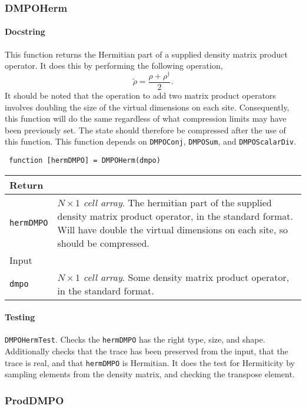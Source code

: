  \subsubsection{DMPOHerm}
 \paragraph{Docstring} This function returns the Hermitian part of a supplied density matrix product operator. It does this by performing the following operation, 
 \begin{equation}
 \tilde{\rho} = \frac{\rho + \rho^{\dagger}}{2}.
 \label{eq:vs3-2}
 \end{equation}
 It should be noted that the operation to add two matrix product operators involves doubling the size of the virtual dimensions on each site. Consequently, this function will do the same regardless of what compression limits may have been previously set. The state should therefore be compressed after the use of this function. This function depends on \lstinline$DMPOConj$, \lstinline$DMPOSum$, and \lstinline$DMPOScalarDiv$.
 \begin{lstlisting}
 function [hermDMPO] = DMPOHerm(dmpo) \end{lstlisting}
 \begin{longtabu}{X[1,l]X[4,l]}
 \hline
 Return & \\ \hline
 \lstinline$hermDMPO$ & \emph{\(N \times 1\) cell array}. The hermitian part of the supplied density matrix product operator, in the standard format. Will have double the virtual dimensions on each site, so should be compressed. \\ \hline
 Input & \\ \hline
 \lstinline$dmpo$ & \emph{\(N \times 1\) cell array}. Some density matrix product operator, in the standard format. \\
 \hline
 \end{longtabu}
 \paragraph{Testing} \lstinline$DMPOHermTest$. Checks the \lstinline$hermDMPO$ has the right type, size, and shape. Additionally checks that the trace has been preserved from the input, that the trace is real, and that \lstinline$hermDMPO$ is Hermitian. It does the test for Hermiticity by sampling elements from the density matrix, and checking the transpose element.
 
 \subsubsection{ProdDMPO}
